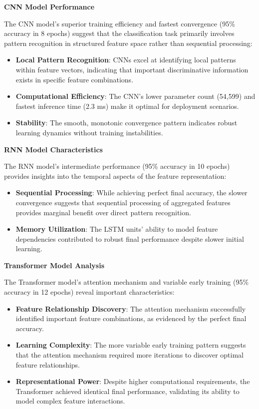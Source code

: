 \documentclass[12pt,a4paper]{article}
\begin{document}
\textbf{CNN Model Performance}

The CNN model's superior training efficiency and fastest convergence (95\% accuracy in 8 epochs) suggest that the classification task primarily involves pattern recognition in structured feature space rather than sequential processing:

\begin{itemize}
\item \textbf{Local Pattern Recognition}: CNNs excel at identifying local patterns within feature vectors, indicating that important discriminative information exists in specific feature combinations.
\item \textbf{Computational Efficiency}: The CNN's lower parameter count (54,599) and fastest inference time (2.3 ms) make it optimal for deployment scenarios.
\item \textbf{Stability}: The smooth, monotonic convergence pattern indicates robust learning dynamics without training instabilities.
\end{itemize}

\textbf{RNN Model Characteristics}

The RNN model's intermediate performance (95\% accuracy in 10 epochs) provides insights into the temporal aspects of the feature representation:

\begin{itemize}
\item \textbf{Sequential Processing}: While achieving perfect final accuracy, the slower convergence suggests that sequential processing of aggregated features provides marginal benefit over direct pattern recognition.
\item \textbf{Memory Utilization}: The LSTM units' ability to model feature dependencies contributed to robust final performance despite slower initial learning.
\end{itemize}

\textbf{Transformer Model Analysis}

The Transformer model's attention mechanism and variable early training (95\% accuracy in 12 epochs) reveal important characteristics:

\begin{itemize}
\item \textbf{Feature Relationship Discovery}: The attention mechanism successfully identified important feature combinations, as evidenced by the perfect final accuracy.
\item \textbf{Learning Complexity}: The more variable early training pattern suggests that the attention mechanism required more iterations to discover optimal feature relationships.
\item \textbf{Representational Power}: Despite higher computational requirements, the Transformer achieved identical final performance, validating its ability to model complex feature interactions.
\end{itemize}
\end{document}
